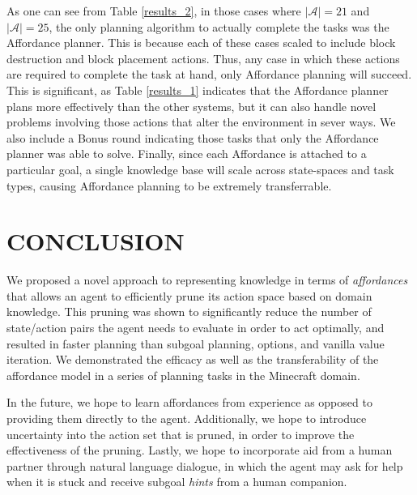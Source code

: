 \documentclass[]{article}
\begin{document}
As one can see from Table \ref{results_2}, in those cases where $|\mathcal{A}| = 21$ and $|\mathcal{A}| = 25$, the only planning algorithm to actually complete the tasks was the Affordance planner. This is because each of these cases scaled to include block destruction and block placement actions. Thus, any case in which these actions are required to complete the task at hand, only Affordance planning will succeed. This is significant, as Table \ref{results_1} indicates that the Affordance planner plans more effectively than the other systems, but it can also handle novel problems involving those actions that alter the environment in sever ways. We also include a Bonus round indicating those tasks that only the Affordance planner was able to solve. Finally, since each Affordance is attached to a particular goal, a single knowledge base will scale across state-spaces and task types, causing Affordance planning to be extremely transferrable.


\section{CONCLUSION}

We proposed a novel approach to representing knowledge in terms of
{\em affordances}~\citep{gibson77} that allows an agent to efficiently
prune its action space based on domain knowledge. This pruning was
shown to significantly reduce the number of state/action pairs the
agent needs to evaluate in order to act optimally, and resulted in
faster planning than subgoal planning, options, and vanilla value
iteration. We demonstrated the efficacy as well as the transferability
of the affordance model in a series of planning tasks in the Minecraft
domain.

In the future, we hope to learn affordances from experience as opposed
to providing them directly to the agent. Additionally, we hope to
introduce uncertainty into the action set that is pruned, in order to
improve the effectiveness of the pruning. Lastly, we hope to
incorporate aid from a human partner through natural language
dialogue, in which the agent may ask for help when it is stuck and
receive subgoal {\it hints} from a human companion.


  
\end{document}
